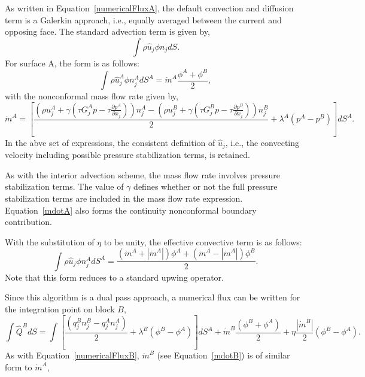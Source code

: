 As written in Equation~\ref{numericalFluxA}, the default convection and diffusion term is a
Galerkin approach, i.e., equally averaged between the current and opposing face. The standard 
advection term is given by,
\begin{equation} 
        \int \rho \hat{u}_j \phi n_j dS.
\label{advection}
\end{equation}
For surface A, the form is as follows:
\begin{equation} 
        \int \rho \hat{u}_j^A \phi n_j^A dS^A = \dot m^A \frac{ \phi^A + \phi^B}{2},
\label{advection}
\end{equation}
with the nonconformal mass flow rate given by,
\begin{equation} 
        \dot {m}^A = [\frac{(\rho u_j^A + \gamma(\tau G_j^A p -\tau \frac{\partial p^A}{\partial x_j}))n_j^A
        				       - (\rho u_j^B + \gamma(\tau G_j^B p -\tau \frac{\partial p^B}{\partial x_j}))n_j^B}{2}
				       + \lambda^A ( p^A - p^B)] dS^A.
\label{mdotA}
\end{equation}
In the abve set of expressions, the consistent definition of $\hat{u}_j$, i.e., the convecting velocity including
possible pressure stabilization terms, is retained.

As with the interior advection scheme, the mass flow rate involves pressure stabilization terms. The value of 
$\gamma$ defines whether or not the full pressure stabilization terms are included in the mass flow rate expression.
Equation~\ref{mdotA} also forms the continuity nonconformal boundary contribution. 

With the substitution of $\eta$ to be unity, the effective convective term is as follows:
\begin{equation} 
        \int \rho \hat{u}_j \phi n_j^A dS^A = \frac{ (\dot m^A + |\dot m^A|) \phi^A +  (\dot m^A - |\dot m^A|)\phi^B}{2}.
\label{advectionAUPW}
\end{equation}
Note that this form reduces to a standard upwing operator.

Since this algorithm is a dual pass approach, a numerical flux can be written for the integration 
point on block $B$,
\begin{equation} 
        \int \hat Q^B dS = \int [\frac{(q_j^B n_j^B - q_j^A n_j^A)}{2}
				+ \lambda^B ( \phi^B - \phi^A) ]dS^A
        				+ \dot m^B \frac{(\phi^B + \phi^A)}{2} 
                                        + \eta \frac{|\dot{m}^B|}{2} (\phi^B - \phi^A).
\label{numericalFluxB}
\end{equation}
As with Equation~\ref{numericalFluxB}, $\dot{m}^B$ (see Equation~\ref{mdotB}) 
is of similar form to $\dot{m}^A$,

